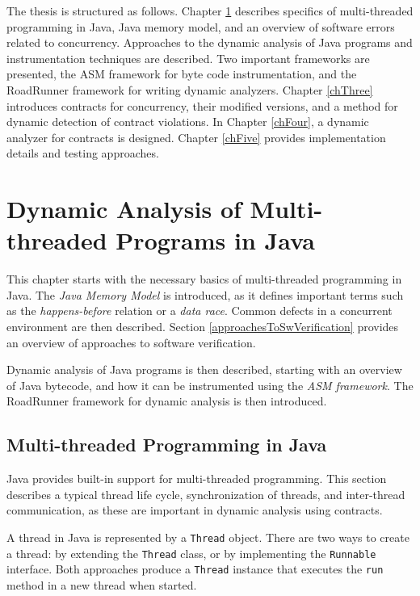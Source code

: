 The thesis is structured as follows. Chapter \ref{chTwo} describes specifics of
multi-threaded programming in Java, Java memory model, and an overview of
software errors related to concurrency. Approaches to the dynamic analysis of
Java programs and instrumentation techniques are described. Two important
frameworks are presented, the ASM framework for byte code instrumentation, and
the RoadRunner framework for writing dynamic analyzers. Chapter \ref{chThree}
introduces contracts for concurrency, their modified versions, and a method for
dynamic detection of contract violations. In Chapter \ref{chFour}, a dynamic
analyzer for contracts is designed. Chapter \ref{chFive} provides implementation
details and testing approaches.



\chapter{Dynamic Analysis of Multi-threaded Programs in Java}
\label{chTwo}

This chapter starts with the necessary basics of multi-threaded programming in
Java.  The \emph{Java Memory Model} is introduced, as it defines important terms
such as the \emph{happens-before} relation or a \emph{data race}. Common defects
in a concurrent environment are then described. Section
\ref{approachesToSwVerification} provides an overview of approaches to software
verification.

Dynamic analysis of Java programs is then described, starting with an overview
of Java bytecode, and how it can be instrumented using the \emph{ASM framework}.
The RoadRunner framework for dynamic analysis is then introduced.


\section{Multi-threaded Programming in Java}

Java provides built-in support for multi-threaded programming. This section
describes a typical thread life cycle, synchronization of threads, and
inter-thread communication, as these are important in dynamic analysis using
contracts.

A thread in Java is represented by a \texttt{Thread} object. There are two ways
to create a thread: by extending the \texttt{Thread} class, or by implementing
the \texttt{Runnable} interface. Both approaches produce a \texttt{Thread}
instance that executes the \texttt{run} method in a new thread when started.

